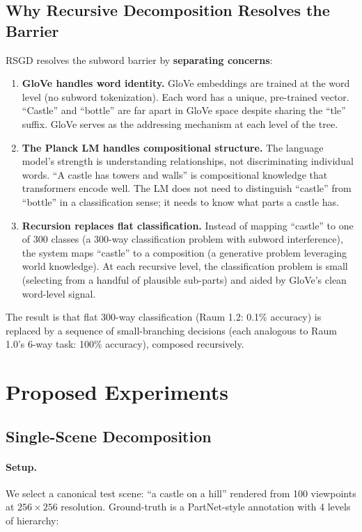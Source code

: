 \documentclass[11pt]{article}
\begin{document}
\subsection{Why Recursive Decomposition Resolves the Barrier}

RSGD resolves the subword barrier by \textbf{separating concerns}:

\begin{enumerate}
    \item \textbf{GloVe handles word identity.} GloVe embeddings are trained at the word level (no subword tokenization). Each word has a unique, pre-trained vector. ``Castle'' and ``bottle'' are far apart in GloVe space despite sharing the ``tle'' suffix. GloVe serves as the addressing mechanism at each level of the tree.

    \item \textbf{The Planck LM handles compositional structure.} The language model's strength is understanding relationships, not discriminating individual words. ``A castle has towers and walls'' is compositional knowledge that transformers encode well. The LM does not need to distinguish ``castle'' from ``bottle'' in a classification sense; it needs to know what parts a castle has.

    \item \textbf{Recursion replaces flat classification.} Instead of mapping ``castle'' to one of 300 classes (a 300-way classification problem with subword interference), the system maps ``castle'' to a composition (a generative problem leveraging world knowledge). At each recursive level, the classification problem is small (selecting from a handful of plausible sub-parts) and aided by GloVe's clean word-level signal.
\end{enumerate}

The result is that flat 300-way classification (Raum 1.2: 0.1\% accuracy) is replaced by a sequence of small-branching decisions (each analogous to Raum 1.0's 6-way task: 100\% accuracy), composed recursively.

\section{Proposed Experiments}

\subsection{Single-Scene Decomposition}

\paragraph{Setup.} We select a canonical test scene: ``a castle on a hill'' rendered from 100 viewpoints at $256 \times 256$ resolution. Ground-truth is a PartNet-style annotation with 4 levels of hierarchy:
\end{document}

